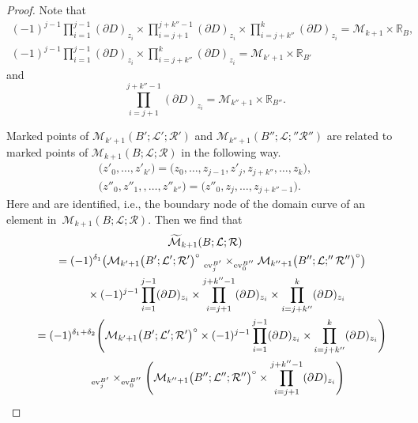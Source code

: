 \documentclass[pdftex]{sigma}
\numberwithin{equation}{section}
\theoremstyle{definition}
\newtheorem{rem}[thm]{Remark}
\begin{document}
\begin{proof}
Note that
\begin{gather*}
(-1)^{j-1} \prod_{i=1}^{j-1}(\partial D)_{z_i} \times \prod_{i=j+1}^{j+k''-1}(\partial D)_{z_i} \times \prod_{i=j+k''}^k (\partial D)_{z_i} = {\mathcal M}_{k+1} \times {\mathbb R}_B,\\
(-1)^{j-1} \prod_{i=1}^{j-1}(\partial D)_{z_i} \times \prod_{i=j+k''}^k (\partial D)_{z_i} = {\mathcal M}_{k'+1} \times {\mathbb R}_{B'}
\end{gather*}
and
\[\prod_{i=j+1}^{j+k''-1}(\partial D)_{z_i} = {\mathcal M}_{k'' + 1} \times {\mathbb R}_{B''}.\]

Marked points of ${\mathcal M}_{k'+1}(B';{\mathcal L}';{\mathcal R}')$ and ${\mathcal M}_{k''+1}(B'';{\mathcal L};''{\mathcal R}'')$
are related to marked points of ${\mathcal M}_{k+1}(B;{\mathcal L};{\mathcal R})$ in the following way.
\begin{gather*}
\bigl(z'_0, \dots, z'_{k'}\bigr) = \bigl(z_0, \dots, z_{j-1}, z'_j, z_{j+k''}, \dots, z_k\bigr),\\
\bigl(z''_0, z''_1,, \dots, z''_{k''}\bigr) = \bigl(z''_0, z_j, \dots, z_{j+k''-1}\bigr).
\end{gather*}
Here  and  are identified, i.e., the boundary node of the domain curve of an element in~${\mathcal M}_{k+1}(B;{\mathcal L};{\mathcal R})$.
Then we find that
\begin{gather}
  \widetilde{\mathcal M}_{k+1}(B;{\mathcal L};{\mathcal R})\nonumber\\
\quad{} =
(-1)^{\delta_1} \bigl( {\mathcal M}_{k'+1}\bigl(B';{\mathcal L}';{\mathcal R}'\bigr)^{\circ} ~_{{\rm ev}_j^{B'}} \times_{{\rm ev}_0^{B''}}
{\mathcal M}_{k''+1}\bigl(B'';{\mathcal L};''{\mathcal R}''\bigr)^{\circ} \bigr) \nonumber \\
\qquad{}  \times (-1)^{j-1}\prod_{i=1}^{j-1}(\partial D)_{z_i} \times
\prod_{i=j+1}^{j+k''-1}(\partial D)_{z_i} \times \prod_{i=j+k''}^k (\partial D)_{z_i} \nonumber \\
\quad{} =  (-1)^{\delta_1 + \delta_2} \Biggl( {\mathcal M}_{k'+1}\bigl(B';{\mathcal L}';{\mathcal R}'\bigr)^{\circ} \times (-1)^{j-1} \prod_{i=1}^{j-1}(\partial D)_{z_i} \times
\prod_{i=j+k''}^k (\partial D)_{z_i} \Biggr)
\nonumber \\
\qquad{}  {}\ {}_{{\rm ev}_j^{B'}}  \times_{{\rm ev}_0^{B''}} \Biggl( {\mathcal M}_{k''+1}\bigl(B'';{\mathcal L}'';{\mathcal R}''\bigr)^{\circ} \times \prod_{i=j+1}^{j+k''-1}(\partial D)_{z_i} \Biggr) \nonumber \\

\end{gather}
\end{proof}
\end{document}
